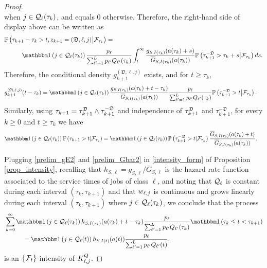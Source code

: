 \documentclass{article}
\theoremstyle{definition}
\numberwithin{equation}{section}
\begin{document}
\begin{proof}
\[\]
when $j\in\mathcal{Q}_{\ell}(\tau_k)$, and equals 0 otherwise. Therefore, the right-hand side of display above can be written as
\begin{align}\label{prelim_gtemp2}
&\Prob{\tau_{k+1}-\tau_{k}>t, z_{k+1}=(\mathfrak{D},\ell,j)\big|\filt_{\tau_k}} =\notag\\[1mm]
&\hspace{1cm}\indic{j\in\inque_\ell(\tau_k)} \frac{\weight_\ell}{\sum_{\ell'=1}^{L}\weight_{\ell'}\ql_{\ell'}(\tau_k)} \int_t^\infty \frac{g_{S,\class(\tau_k)}(\age(\tau_k)+s)}{\overline G_{S,\class(\tau_k)}(\age(\tau_k))}  \Prob{\tau_{k+1}^{-\mathfrak{D}}>\tau_k+s\big|\filt_{\tau_k}}ds.
\end{align}
Therefore, the conditional density $g^{(\mathfrak{D},\ell,j)}_{k+1}$ exists, and for $t\geq \tau_k$,
\begin{align}\label{prelim_gE2}
  g^{(\mathfrak{R},\ell,j)}_{k+1}(t-\tau_k)& = \indic{j\in\inque_\ell(\tau_k)} \frac{g_{S,\class(\tau_k)}(\age(\tau_k)+t-\tau_k)}{\overline G_{S,\class(\tau_k)}(\age(\tau_k))} \frac{\weight_\ell}{\sum_{\ell'=1}^{L}\weight_{\ell'}\ql_{\ell'}(\tau_k)} \Prob{\tau_{k+1}^{-\mathfrak{D}}>t\big|\filt_{\tau_k}}.
\end{align}
Similarly, using $\tau_{k+1}= \tau^{\mathfrak{D}}_{k+1} \wedge \tau_{k+1}^{-\mathfrak{D}}$ and independence of $\tau^{\mathfrak{D}}_{k+1}$ and $\tau_{k+1}^{-\mathfrak{D}}$, for every $k\ge0$ and $t\geq \tau_k$ we have
\begin{align}\label{prelim_Gbar2}
  \indic{j\in\inque_\ell(\tau_k)}\Prob{\tau_{k+1}>t|\filt_{\tau_k}}
  &=  \indic{j\in\inque_\ell(\tau_k)} \Prob{\tau_{k+1}^{-\mathfrak{D}}>t|\filt_{\tau_k}} \frac{\overline G_{S,\class(\tau_k)}(\age(\tau_k)+t)}{\overline G_{S,\class(\tau_k)}(\age(\tau_k))} .
\end{align}


Plugging \eqref{prelim_gE2} and \eqref{prelim_Gbar2}  in \eqref{intensity_form} of Proposition \ref{prop_intensity},  recalling that $h_{S,\ell}=g_{S,\ell}/\overline G_{S,\ell}$ is the hazard rate function associated to the service times of jobs of class $\ell$, and noting that $\mathcal{Q}_\ell$ is constant during each interval   $(\tau_k,\tau_{k+1})$ and that $w_{\ell,j}$ is continuous and grows linearly during each interval $(\tau_k,\tau_{k+1})$ where $j\in\mathcal{Q}_\ell(\tau_k)$, we conclude that the process
\begin{align*}
  &\sum_{k=0}^\infty \indic{j\in\inque_\ell(\tau_k)} h_{S,\class(\tau_k)}(\age(\tau_k)+t-\tau_k) \frac{\weight_\ell}{\sum_{\ell'=1}^{L}\weight_{\ell'}\ql_{\ell'}(\tau_k)} \indic{\tau_k\leq t < \tau_{k+1}}\\
  &\hspace{1cm}= \indic{j\in\inque_\ell(t)} h_{S,\class(t)}(\age(t)) \frac{\weight_\ell}{\sum_{\ell'=1}^{L}\weight_{\ell'}\ql_{\ell'}(t)}.
\end{align*}
is an $\{\mathcal{F}_t\}$-intensity of $K^Q_{\ell,j}$.
\end{proof}
\end{document}

